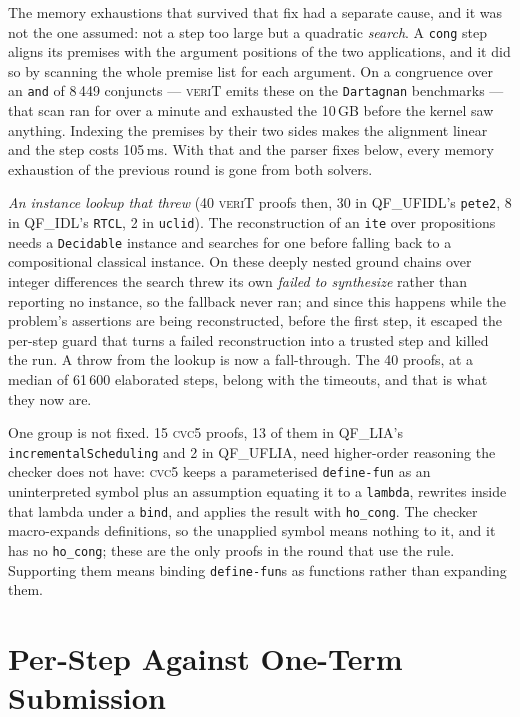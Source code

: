 \documentclass[runningheads]{llncs}
\newcommand{\cvcv}{\textsc{cvc5}\xspace}
\newcommand{\verit}{\textsc{veriT}\xspace}
\newcommand{\rulename}[1]{\texttt{#1}}
\begin{document}
The memory exhaustions that survived that fix had a separate cause, and it was
not the one assumed: not a step too large but a quadratic \emph{search}. A
\rulename{cong} step aligns its premises with the argument positions of the two
applications, and it did so by scanning the whole premise list for each
argument. On a congruence over an \texttt{and} of 8\,449 conjuncts --- \verit
emits these on the \texttt{Dartagnan} benchmarks --- that scan ran for over a
minute and exhausted the 10\,GB before the kernel saw anything. Indexing the
premises by their two sides makes the alignment linear and the step costs
105\,ms. With that and the parser fixes below, every memory exhaustion of the
previous round is gone from both solvers.

\emph{An instance lookup that threw} (40 \verit proofs then, 30 in QF\_UFIDL's
\texttt{pete2}, 8 in QF\_IDL's \texttt{RTCL}, 2 in \texttt{uclid}). The
reconstruction of an \texttt{ite} over propositions needs a
\texttt{Decidable} instance and searches for one before falling back to a
compositional classical instance. On these deeply nested ground chains over
integer differences the search threw its own \emph{failed to synthesize}
rather than reporting no instance, so the fallback never ran; and since this
happens while the problem's assertions are being reconstructed, before the
first step, it escaped the per-step guard that turns a failed reconstruction
into a trusted step and killed the run. A throw from the lookup is now a
fall-through. The 40 proofs, at a median of 61\,600 elaborated steps, belong
with the timeouts, and that is what they now are.

One group is not fixed. 15 \cvcv proofs, 13 of them in QF\_LIA's
\texttt{incrementalScheduling} and 2 in QF\_UFLIA, need higher-order reasoning
the checker does not have: \cvcv keeps a parameterised \texttt{define-fun} as an uninterpreted
symbol plus an assumption equating it to a \texttt{lambda}, rewrites inside
that lambda under a \rulename{bind}, and applies the result with
\rulename{ho\_cong}. The checker macro-expands definitions, so the unapplied
symbol means nothing to it, and it has no \rulename{ho\_cong}; these are the
only proofs in the round that use the rule. Supporting them means binding
\texttt{define-fun}s as functions rather than expanding them.

\section{Per-Step Against One-Term Submission}
\label{sec:shapes}
\end{document}
